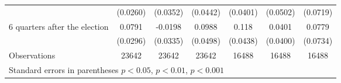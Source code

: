 \begin{table}[!ht]
\begin{tabular}{l*{6}{c}}
                    &    (0.0260)         &    (0.0352)         &    (0.0442)         &    (0.0401)         &    (0.0502)         &    (0.0719)         \\
[0.5em]
 6 quarters after the election&      0.0791\sym{**} &     -0.0198         &      0.0988\sym{*}  &       0.118\sym{**} &      0.0401         &      0.0779         \\
                    &    (0.0296)         &    (0.0335)         &    (0.0498)         &    (0.0438)         &    (0.0400)         &    (0.0734)         \\
\hline
Observations        &       23642         &       23642         &       23642         &       16488         &       16488         &       16488         \\
\hline\hline
\multicolumn{7}{l}{ Standard errors in parentheses \sym{*} \(p<0.05\), \sym{**} \(p<0.01\), \sym{***} \(p<0.001\)}\\
\end{tabular}
\end{table}
